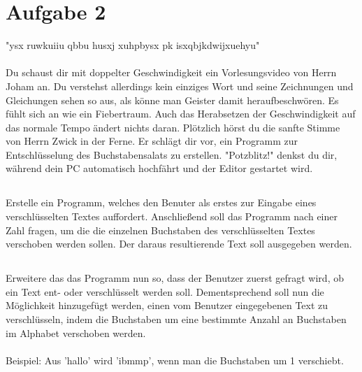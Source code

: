 \documentclass{standalone}
\begin{document}
\section{Aufgabe 2}
"ysx ruwkuiiu qbbu husxj xuhpbysx pk isxqbjkdwijxuehyu"\\ \\
Du schaust dir mit doppelter Geschwindigkeit ein Vorlesungsvideo von Herrn Joham an. Du verstehst allerdings kein 
einziges Wort und seine Zeichnungen und Gleichungen sehen so aus, als könne man Geister damit heraufbeschwören. 
Es fühlt sich an wie ein Fiebertraum. Auch das Herabsetzen der Geschwindigkeit auf das 
normale Tempo ändert nichts daran. Plötzlich hörst du die sanfte Stimme von Herrn Zwick in der Ferne. Er schlägt dir vor, 
ein Programm zur Entschlüsselung des Buchstabensalats zu erstellen. "Potzblitz!" denkst du dir, während dein PC automatisch hochfährt
und der Editor gestartet wird.
\subsection{}
Erstelle ein Programm, welches den Benuter als erstes zur Eingabe eines verschlüsselten Textes auffordert. 
Anschließend soll das Programm nach einer Zahl fragen, um die die einzelnen Buchstaben des verschlüsselten Textes
verschoben werden sollen. Der daraus resultierende Text soll ausgegeben werden.
\subsection{}
Erweitere das das Programm nun so, dass der Benutzer zuerst gefragt wird, ob ein Text ent- oder verschlüsselt werden soll.
Dementsprechend soll nun die Möglichkeit hinzugefügt werden, einen vom Benutzer eingegebenen Text zu verschlüsseln, indem 
die Buchstaben um eine bestimmte Anzahl an Buchstaben im Alphabet verschoben werden.\\ \\
Beispiel: Aus 'hallo' wird 'ibmmp', wenn man die Buchstaben um 1 verschiebt.
\end{document}
